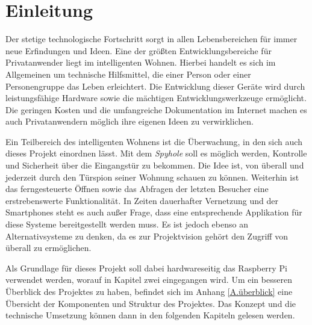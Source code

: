 
\chapter{Einleitung}
Der stetige technologische Fortschritt sorgt in allen Lebensbereichen für immer neue Erfindungen und Ideen. Eine der größten Entwicklungsbereiche für Privatanwender liegt im intelligenten Wohnen. Hierbei handelt es sich im Allgemeinen um technische Hilfsmittel, die einer Person oder einer Personengruppe das Leben erleichtert. Die Entwicklung dieser Geräte wird durch leistungsfähige Hardware sowie die mächtigen Entwicklungswerkzeuge ermöglicht. Die geringen Kosten und die umfangreiche Dokumentation im Internet machen es auch Privatanwendern möglich ihre eigenen Ideen zu verwirklichen.  
\par
Ein Teilbereich des intelligenten Wohnens ist die Überwachung, in den sich auch dieses Projekt einordnen lässt. Mit dem \textit{Spyhole} soll es möglich werden, Kontrolle und Sicherheit über die Eingangstür zu bekommen. Die Idee ist, von überall und jederzeit durch den Türspion seiner Wohnung schauen zu können. Weiterhin ist das ferngesteuerte Öffnen sowie das Abfragen der letzten Besucher eine erstrebenswerte Funktionalität. In Zeiten dauerhafter Vernetzung und der Smartphones steht es auch außer Frage, dass eine entsprechende Applikation für diese Systeme bereitgestellt werden muss. Es ist jedoch ebenso an Alternativsysteme zu denken, da es zur Projektvision gehört den Zugriff von überall zu ermöglichen. 
\par
Als Grundlage für dieses Projekt soll dabei hardwareseitig das Raspberry Pi verwendet werden, worauf in Kapitel zwei eingegangen wird. Um ein besseren Überblick des Projektes zu haben, befindet sich im Anhang \ref{A.überblick} eine Übersicht der Komponenten und Struktur des Projektes. Das Konzept und die technische Umsetzung können dann in den folgenden Kapiteln gelesen werden.